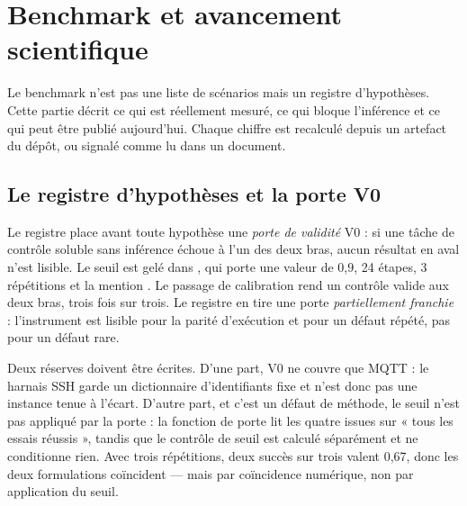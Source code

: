 \section{Benchmark et avancement scientifique}
\label{sec:benchmark}

Le benchmark n'est pas une liste de scénarios mais un registre d'hypothèses.
Cette partie décrit ce qui est réellement mesuré, ce qui bloque l'inférence et
ce qui peut être publié aujourd'hui. Chaque chiffre est recalculé depuis un
artefact du dépôt, ou signalé comme lu dans un document.

\subsection{Le registre d'hypothèses et la porte V0}

Le registre place avant toute hypothèse une \emph{porte de validité} V0 : si une
tâche de contrôle soluble sans inférence échoue à l'un des deux bras, aucun
résultat en aval n'est lisible. Le seuil est gelé dans
, qui porte une valeur de
0,9, 24 étapes, 3 répétitions et la mention . Le passage
de calibration rend un contrôle valide aux deux bras, trois fois sur trois. Le
registre en tire une porte \emph{partiellement franchie} : l'instrument est
lisible pour la parité d'exécution et pour un défaut répété, pas pour un défaut
rare.

Deux réserves doivent être écrites. D'une part, V0 ne couvre que MQTT : le
harnais SSH garde un dictionnaire d'identifiants fixe et n'est donc pas une
instance tenue à l'écart. D'autre part, et c'est un défaut de méthode, le seuil
n'est pas appliqué par la porte : la fonction de porte lit les quatre issues sur
« tous les essais réussis », tandis que le contrôle de seuil est calculé
séparément et ne conditionne rien. Avec trois répétitions, deux succès sur trois
valent 0,67, donc les deux formulations coïncident --- mais par coïncidence
numérique, non par application du seuil.

